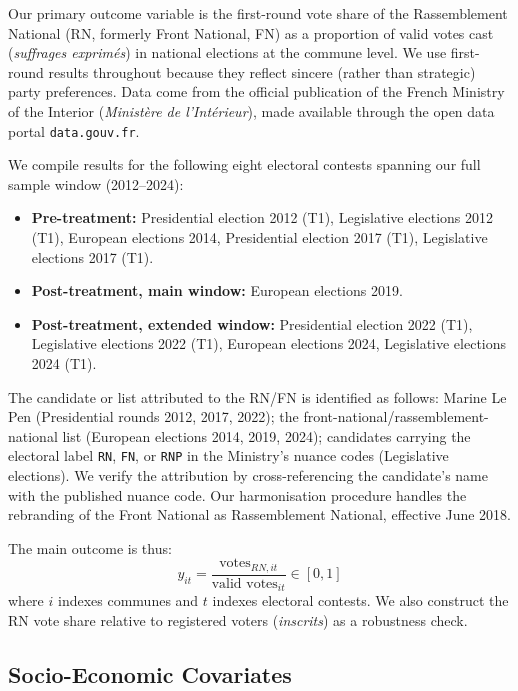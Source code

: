 Our primary outcome variable is the first-round vote share of the Rassemblement National (RN, formerly Front National, FN) as a proportion of valid votes cast (\textit{suffrages exprimés}) in national elections at the commune level. We use first-round results throughout because they reflect sincere (rather than strategic) party preferences. Data come from the official publication of the French Ministry of the Interior (\textit{Ministère de l'Intérieur}), made available through the open data portal \texttt{data.gouv.fr}.

We compile results for the following eight electoral contests spanning our full sample window (2012--2024):
\begin{itemize}
  \item \textbf{Pre-treatment:} Presidential election 2012 (T1), Legislative elections 2012 (T1), European elections 2014, Presidential election 2017 (T1), Legislative elections 2017 (T1).
  \item \textbf{Post-treatment, main window:} European elections 2019.
  \item \textbf{Post-treatment, extended window:} Presidential election 2022 (T1), Legislative elections 2022 (T1), European elections 2024, Legislative elections 2024 (T1).
\end{itemize}

The candidate or list attributed to the RN/FN is identified as follows: Marine Le Pen (Presidential rounds 2012, 2017, 2022); the front-national/rassemblement-national list (European elections 2014, 2019, 2024); candidates carrying the electoral label \texttt{RN}, \texttt{FN}, or \texttt{RNP} in the Ministry's nuance codes (Legislative elections). We verify the attribution by cross-referencing the candidate's name with the published nuance code. Our harmonisation procedure handles the rebranding of the Front National as Rassemblement National, effective June 2018.

The main outcome is thus:
\begin{equation}
  y_{it} = \frac{\text{votes}_{RN,it}}{\text{valid votes}_{it}} \in [0,1]
\end{equation}
where $i$ indexes communes and $t$ indexes electoral contests. We also construct the RN vote share relative to registered voters (\textit{inscrits}) as a robustness check.

\subsection{Socio-Economic Covariates}

